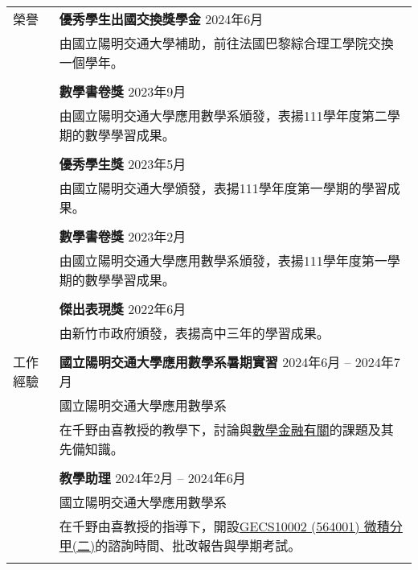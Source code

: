 \documentclass[letterpaper, 11pt]{article}
\begin{document}
\begin{CJK*}{UTF8}{bsmi}
\begin{center}
\begin{longtable}{p{0.72in}p{5.97in}}
        
        {\textcolor{OliveGreen}{榮譽}} & \textbf{優秀學生出國交換獎學金} \hfill 2024年6月\\
        & 由國立陽明交通大學補助，前往法國巴黎綜合理工學院交換一個學年。 \\
        & \\
        & \textbf{數學書卷獎} \hfill 2023年9月\\
        & 由國立陽明交通大學應用數學系頒發，表揚111學年度第二學期的數學學習成果。\\
        & \\
        & \textbf{優秀學生獎} \hfill 2023年5月\\
        & 由國立陽明交通大學頒發，表揚111學年度第一學期的學習成果。\\
        & \\
        & \textbf{數學書卷獎} \hfill 2023年2月\\
        & 由國立陽明交通大學應用數學系頒發，表揚111學年度第一學期的數學學習成果。\\
        & \\
        & \textbf{傑出表現獎} \hfill 2022年6月\\
        & 由新竹市政府頒發，表揚高中三年的學習成果。\\
        & \\
        
        
        {\textcolor{OliveGreen}{工作經驗}} & \textbf{國立陽明交通大學應用數學系暑期實習} \hfill 2024年6月 -- 2024年7月 \\
        & 國立陽明交通大學應用數學系 \\
        & 在千野由喜教授的教學下，討論與\href{https://hackmd.io/@eiken-sc11/B1QcaW3B0}{數學金融有關}的課題及其先備知識。\\
        & \\
        
        & \textbf{教學助理}  \hfill 2024年2月 -- 2024年6月 \\
        & 國立陽明交通大學應用數學系\\
        & 在千野由喜教授的指導下，開設\href{https://timetable.nycu.edu.tw/?r=main/crsoutline&Acy=112&Sem=2&CrsNo=564001&lang=zh-tw}{GECS10002 (564001) 微積分甲(二)}的諮詢時間、批改報告與學期考試。\\
        & \\
        

\end{longtable}
\end{center}
\end{CJK*}
\end{document}
